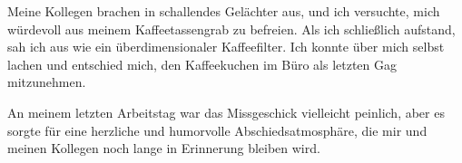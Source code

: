 Meine Kollegen brachen in schallendes Gelächter aus, und ich versuchte, mich würde\-voll aus meinem Kaffeetassengrab zu befreien. Als ich schließlich aufstand, sah ich aus wie ein überdimensionaler Kaffeefilter. Ich konnte über mich selbst lachen und entschied mich, den Kaffeekuchen im Büro als letzten Gag mitzunehmen.

An meinem letzten Arbeitstag war das Missgeschick vielleicht peinlich, aber es sorgte für eine herzliche und humorvolle Abschiedsatmosphäre, die mir und meinen Kollegen noch lange in Erinnerung bleiben wird.

